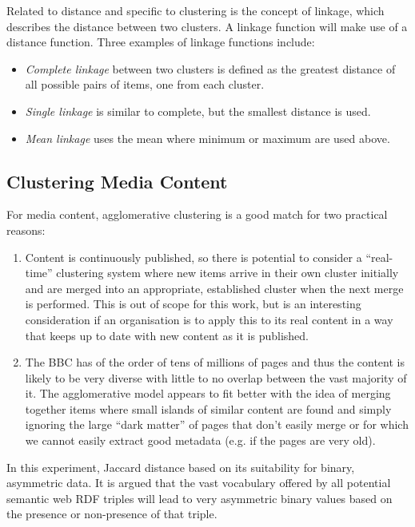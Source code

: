 Related to distance and specific to clustering is the concept of
linkage, which describes the distance between two clusters. A linkage
function will make use of a distance function. Three examples
of linkage functions include:

\begin{itemize}
\item \emph{Complete linkage} between two clusters is defined as the
  greatest distance of all possible pairs of items, one from each
  cluster.
\item \emph{Single linkage} is similar to complete, but the smallest
  distance is used.
\item \emph{Mean linkage} uses the mean where minimum or maximum
  are used above.
\end{itemize}

\subsection{Clustering Media Content}
\label{sec:clustering-media}

For media content, agglomerative clustering is a good match for two
practical reasons:

\begin{enumerate}
\item Content is continuously published, so there is potential
  to consider a ``real-time'' clustering system where new items
  arrive in their own cluster initially and are merged into an
  appropriate, established cluster when the next merge is performed.
  This is out of scope for this work, but is an interesting
  consideration if an organisation is to apply this to its real
  content in a way that keeps up to date with new content as it is
  published.
\item The BBC has of the order of tens of millions of pages and thus
  the content is likely to be very diverse with little to no overlap
  between the vast majority of it. The agglomerative model appears to
  fit better with the idea of merging together items where small
  islands of similar content are found and simply ignoring the large
  ``dark matter'' of pages that don't easily merge or for which we
  cannot easily extract good metadata (e.g. if the pages are very
  old).
\end{enumerate}

In this experiment, Jaccard distance\cite{witten2005data}
based on its suitability for binary, asymmetric data. It is argued
that the vast vocabulary offered by all potential semantic web
RDF triples will lead to very asymmetric binary values based on the
presence or non-presence of that triple.

